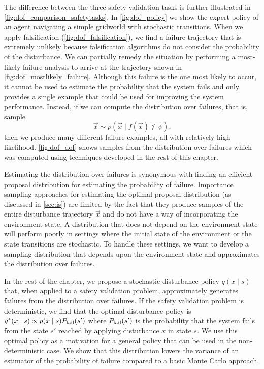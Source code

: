 The difference between the three safety validation tasks is further illustrated in \cref{fig:dof_comparison_safetytasks}. In \cref{fig:dof_policy} we show the expert policy of an agent navigating a simple gridworld with stochastic transitions. When we apply falsification (\cref{fig:dof_falsification}), we find a failure trajectory that is extremely unlikely because falsification algorithms do not consider the probability of the disturbance. We can partially remedy the situation by performing a most-likely failure analysis to arrive at the trajectory shown in \cref{fig:dof_mostlikely_failure}. Although this failure is the one most likely to occur, it cannot be used to estimate the probability that the system fails and only provides a single example that could be used for improving the system performance. Instead, if we can compute the distribution over failures, that is, sample 
\begin{equation}
    \vec{x} \sim p(\vec{x} \mid f(\vec{x}) \not \in \psi) \text{,}
\end{equation}
then we produce many different failure examples, all with relatively high likelihood. \cref{fig:dof_dof} shows samples from the distribution over failures which was computed using techniques developed in the rest of this chapter. 

Estimating the distribution over failures is synonymous with finding an efficient proposal distribution for estimating the probability of failure. Importance sampling approaches for estimating the optimal proposal distribution (as discussed in \cref{sec:is}) are limited by the fact that they produce samples of the entire disturbance trajectory $\vec{x}$ and do not have a way of incorporating the environment state. A distribution that does not depend on the environment state will perform poorly in settings where the initial state of the environment or the state transitions are stochastic. To handle these settings, we want to develop a sampling distribution that depends upon the environment state and approximates the distribution over failures.

In the rest of the chapter, we propose a stochastic disturbance policy $q(x \mid s)$ that, when applied to a safety validation problem, approximately generates failures from the distribution over failures. If the safety validation problem is deterministic, we find that the optimal disturbance policy is $q^*(x \mid s) \propto p(x \mid s) P_{\rm fail}(s')$ where $P_{\rm fail}(s')$ is the probability that the system fails from the state $s'$ reached by applying disturbance $x$ in state $s$. We use this optimal policy as a motivation for a general policy that can be used in the non-deterministic case. We show that this distribution lowers the variance of an estimator of the probability of failure compared to a basic Monte Carlo approach. 

